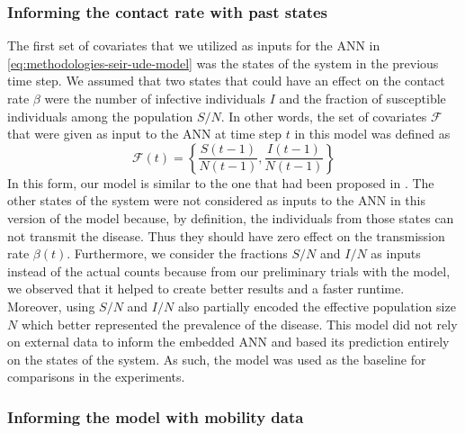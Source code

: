 \subsubsection{Informing the contact rate with past states}
The first set of covariates that we utilized as inputs for the \gls{ANN} in \autoref{eq:methodologies-seir-ude-model} was the states of the system in the previous time step.
We assumed that two states that could have an effect on the contact rate $\beta$ were the number of infective individuals $I$ and the fraction of susceptible individuals among the population $S/N$.
In other words, the set of covariates $\mathcal{F}$ that were given as input to the \gls{ANN} at time step $t$ in this model was defined as
\begin{equation*}
    \mathcal{F}(t) = \left\lbrace \frac{S(t-1)}{N(t-1)}, \frac{I(t-1)}{N(t-1)} \right\rbrace
\end{equation*}
In this form, our model is similar to the one that had been proposed in \cite{dandekarMachineLearningAidedGlobal2020a}.
The other states of the system were not considered as inputs to the \gls{ANN} in this version of the model because, by definition, the individuals from those states can not transmit the disease.
Thus they should have zero effect on the transmission rate $\beta(t)$.
Furthermore, we consider the fractions $S/N$ and $I/N$ as inputs instead of the actual counts because from our preliminary trials with the model, we observed that it helped to create better results and a faster runtime.
Moreover, using $S/N$ and $I/N$ also partially encoded the effective population size $N$ which better represented the prevalence of the disease.
This model did not rely on external data to inform the embedded \gls{ANN} and based its prediction entirely on the states of the system.
As such, the model was used as the baseline for comparisons in the experiments.

\subsubsection{Informing the model with mobility data}

